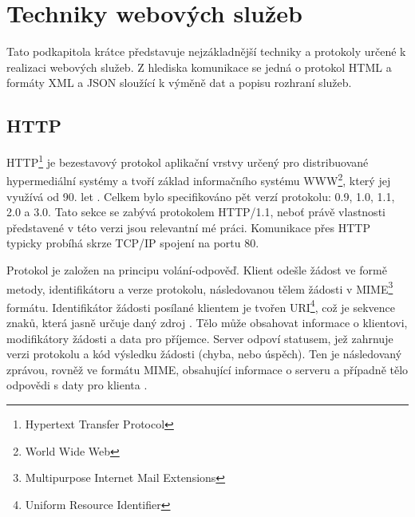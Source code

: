 \documentclass[czech,DP]{thesiskiv}
\begin{document}

\section{Techniky webových služeb}
\label{sec:ws-tech}

Tato podkapitola krátce představuje nejzákladnější techniky a protokoly určené k realizaci webových služeb. Z hlediska komunikace se jedná o protokol HTML a formáty XML a JSON sloužící k výměně dat a popisu rozhraní služeb.





\subsection{HTTP}

HTTP\footnote{Hypertext Transfer Protocol} je bezestavový protokol aplikační vrstvy určený pro distribuované hypermediální systémy a tvoří základ informačního systému WWW\footnote{World Wide Web}, který jej využívá od 90. let \cite{httpRfc}. Celkem bylo specifikováno pět verzí protokolu: 0.9, 1.0, 1.1, 2.0 a 3.0. Tato sekce se zabývá protokolem HTTP/1.1, neboť právě vlastnosti představené v této verzi jsou relevantní mé práci. Komunikace přes HTTP typicky probíhá skrze TCP/IP spojení na portu 80. 

Protokol je založen na principu volání-odpověď. Klient odešle žádost ve formě metody, identifikátoru a verze protokolu, následovanou tělem žádosti v MIME\footnote{Multipurpose Internet Mail Extensions} formátu. Identifikátor žádosti posílané klientem je tvořen URI\footnote{Uniform Resource Identifier}, což je sekvence znaků, která jasně určuje daný zdroj  \cite{uriRfc}. Tělo může obsahovat informace o klientovi, modifikátory žádosti a data pro příjemce. Server odpoví statusem, jež zahrnuje verzi protokolu a kód výsledku žádosti (chyba, nebo úspěch). Ten je následovaný zprávou, rovněž ve formátu MIME, obsahující informace o serveru a případně tělo odpovědi s daty pro klienta \cite{httpRfc}.
\end{document}
